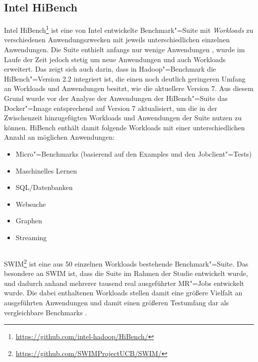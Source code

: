 \subsection{Intel HiBench}
\label{subsec:hibench}

Intel HiBench\footnote{\url{https://github.com/intel-hadoop/HiBench/}} ist eine von Intel entwickelte Benchmark"=Suite mit \emph{Workloads} zu verschiedenen Anwendungszwecken mit jeweils unterschiedlichen einzelnen Anwendungen.
Die Suite enthielt anfangs nur wenige Anwendungen \cite{Huang2010}, wurde im Laufe der Zeit jedoch stetig um neue Anwendungen und auch Workloads erweitert.
Das zeigt sich auch darin, dass in Hadoop"=Benchmark die HiBench"=Version \mbox{2.2} integriert ist, die einen noch deutlich geringeren Umfang an Workloads und Anwendungen besitzt, wie \zB die aktuellere Version 7.
Aus diesem Grund wurde vor der Analyse der Anwendungen der HiBench"=Suite das Docker"=Image entsprechend auf Version 7 aktualisiert, um die in der Zwischenzeit hinzugefügten Workloads und Anwendungen der Suite nutzen zu können.
HiBench enthält damit folgende Workloads mit einer unterschiedlichen Anzahl an möglichen Anwendungen:

\begin{itemize}
    \item Micro"=Benchmarks (basierend auf den Examples und den Jobclient"=Tests)
    \item Maschinelles Lernen
    \item SQL/Datenbanken
    \item Websuche
    \item Graphen
    \item Streaming
\end{itemize}

\subsection{}
\label{subsec:swim}

\gls{SWIM}\footnote{\url{https://github.com/SWIMProjectUCB/SWIM/}} ist eine aus 50 einzelnen Workloads bestehende Benchmark"=Suite.
Das besondere an \gls{SWIM} ist, dass die Suite im Rahmen der Studie \cite{Chen2012} entwickelt wurde, und dadurch anhand mehrerer tausend real ausgeführter \gls{MR}"=Jobs entwickelt wurde.
Die dabei enthaltenen Workloads stellen damit eine größere Vielfalt an ausgeführten Anwendungen und damit einen größeren Testumfang dar als vergleichbare Benchmarks \cite{SwimWikiHome}.


